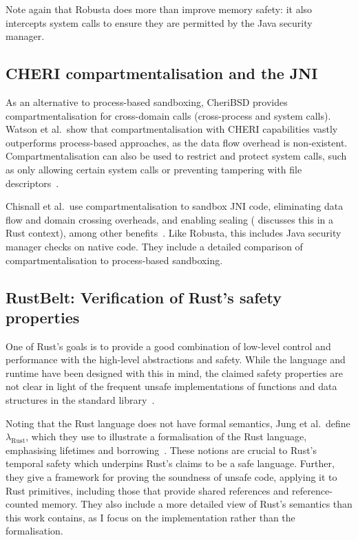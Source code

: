 \documentclass[dissertation.tex]{subfiles}
\begin{document}
Note again that Robusta does more than improve memory safety: it also
intercepts system calls to ensure they are permitted by the Java
security manager.


\subsection{CHERI compartmentalisation and the JNI}
\label{sec:rel-cheri-jni}

As an alternative to process-based sandboxing, CheriBSD provides
compartmentalisation for cross-domain calls (cross-process and system
calls).
Watson et al.\ show that compartmentalisation with CHERI capabilities
vastly outperforms process-based approaches, as the data flow overhead
is non-existent.
Compartmentalisation can also be used to restrict and protect system
calls, such as only allowing certain system calls or preventing
tampering with file descriptors~\cite{cheri2015}.

Chisnall et al.\ use compartmentalisation to sandbox JNI code, eliminating
data flow and domain crossing overheads, and enabling sealing
( discusses this in a Rust context), among
other benefits~\cite{cheri-jni}.
Like Robusta, this includes Java security manager checks on native code.
They include a detailed comparison of compartmentalisation to
process-based sandboxing.


\subsection{RustBelt: Verification of Rust's safety properties}

One of Rust's goals is to provide a good combination of low-level
control and performance with the high-level abstractions and safety.
While the language and runtime have been designed with this in mind,
the claimed safety properties are not clear in light of the frequent
unsafe implementations of functions and data structures in the standard
library~\cite{rustbelt-web}.

Noting that the Rust language does not have formal semantics, Jung et
al.\ define \(\lambda_\textrm{Rust}\), which they use to illustrate a
formalisation of the Rust language, emphasising lifetimes and
borrowing~\cite{jung-rustbelt}.
These notions are crucial to Rust's temporal safety which underpins
Rust's claims to be a safe language.
Further, they give a framework for proving the soundness of unsafe code,
applying it to Rust primitives, including those that provide shared
references and reference-counted memory.
They also include a more detailed view of Rust's semantics than this
work contains, as I focus on the implementation rather than the
formalisation.
\end{document}
